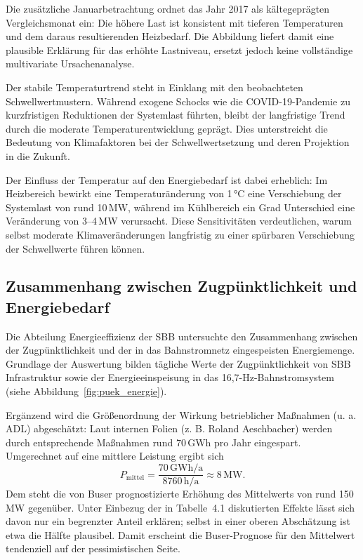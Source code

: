 \documentclass[12pt,oneside]{article}
\begin{document}
Die zusätzliche Januarbetrachtung ordnet das Jahr 2017 als kältegeprägten Vergleichsmonat ein: Die höhere Last ist konsistent mit tieferen Temperaturen und dem daraus resultierenden Heizbedarf. Die Abbildung liefert damit eine plausible Erklärung für das erhöhte Lastniveau, ersetzt jedoch keine vollständige multivariate Ursachenanalyse.

Der stabile Temperaturtrend steht in Einklang mit den beobachteten Schwellwertmustern. Während exogene Schocks wie die COVID-19-Pandemie zu kurzfristigen Reduktionen der Systemlast führten, bleibt der langfristige Trend durch die moderate Temperaturentwicklung geprägt. Dies unterstreicht die Bedeutung von Klimafaktoren bei der Schwellwertsetzung und deren Projektion in die Zukunft.

Der Einfluss der Temperatur auf den Energiebedarf ist dabei erheblich: Im Heizbereich bewirkt eine Temperaturänderung von 1\,°C eine Verschiebung der Systemlast von rund 10\,MW, während im Kühlbereich ein Grad Unterschied eine Veränderung von 3–4\,MW verursacht. Diese Sensitivitäten verdeutlichen, warum selbst moderate Klimaveränderungen langfristig zu einer spürbaren Verschiebung der Schwellwerte führen können.

\subsection{Zusammenhang zwischen Zugpünktlichkeit und Energiebedarf}

Die Abteilung Energieeffizienz der SBB untersuchte den Zusammenhang zwischen der Zugpünktlichkeit und der in das Bahnstromnetz eingespeisten Energiemenge. Grundlage der Auswertung bilden tägliche Werte der Zugpünktlichkeit von SBB Infrastruktur sowie der Energieeinspeisung in das 16{,}7-Hz-Bahnstromsystem (siehe Abbildung~\ref{fig:puek_energie}).

Ergänzend wird die Größenordnung der Wirkung betrieblicher Maßnahmen (u. a. ADL) abgeschätzt: Laut internen Folien (z. B. Roland Aeschbacher) werden durch entsprechende Maßnahmen rund 70\,GWh pro Jahr eingespart. Umgerechnet auf eine mittlere Leistung ergibt sich
\[
P_\mathrm{mittel} = \frac{70\,\mathrm{GWh/a}}{8760\,\mathrm{h/a}} \approx 8\,\mathrm{MW}.
\]
Dem steht die von Buser prognostizierte Erhöhung des Mittelwerts von rund 150\,MW gegenüber. Unter Einbezug der in Tabelle~4.1 diskutierten Effekte lässt sich davon nur ein begrenzter Anteil erklären; selbst in einer oberen Abschätzung ist etwa die Hälfte plausibel. Damit erscheint die Buser-Prognose für den Mittelwert tendenziell auf der pessimistischen Seite.
\end{document}
